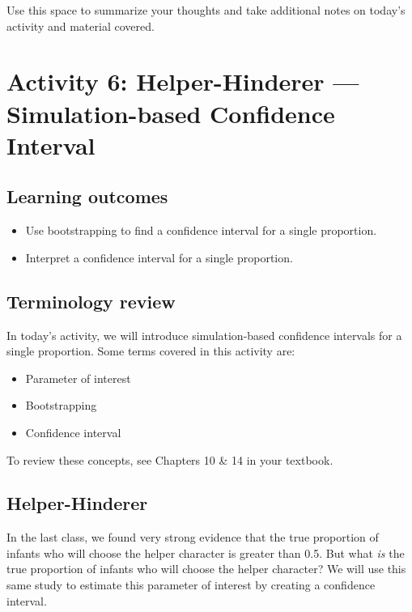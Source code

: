 \documentclass[
]{report}
\begin{document}
Use this space to summarize your thoughts and take additional notes on today's activity and material covered.

\newpage

\section{Activity 6: Helper-Hinderer --- Simulation-based Confidence Interval}\label{activity-6-helper-hinderer-simulation-based-confidence-interval}


\subsection{Learning outcomes}\label{learning-outcomes-5}

\begin{itemize}
\item
  Use bootstrapping to find a confidence interval for a single proportion.
\item
  Interpret a confidence interval for a single proportion.
\end{itemize}

\subsection{Terminology review}\label{terminology-review-4}

In today's activity, we will introduce simulation-based confidence intervals for a single proportion. Some terms covered in this activity are:

\begin{itemize}
\item
  Parameter of interest
\item
  Bootstrapping
\item
  Confidence interval
\end{itemize}

To review these concepts, see Chapters 10 \& 14 in your textbook.

\subsection{Helper-Hinderer}\label{helper-hinderer-2}

In the last class, we found very strong evidence that the true proportion of infants who will choose the helper character is greater than 0.5. But what \emph{is} the true proportion of infants who will choose the helper character? We will use this same study to estimate this parameter of interest by creating a confidence interval.
\end{document}
